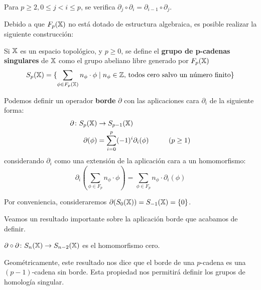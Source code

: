 \begin{corollary}
  Para $p \geq 2, 0 \leq j < i \leq p$, se verifica $\partial_j \circ \partial_i = \partial_{i-1} \circ \partial_j$.
\end{corollary}

Debido a que $F_{p}({\mathbb X})$ no está dotado de estructura algebraica, es posible realizar la siguiente construcción:

\begin{definition}
  Si ${\mathbb X}$ es un espacio topológico, y $p \geq 0$, se define el \textbf{grupo de p-cadenas singulares} de ${\mathbb X}$
  como el grupo abeliano libre generado por $F_{p}({\mathbb X})$
  \[ S_p({\mathbb X}) = \{\sum_{\phi \in F_{p}({\mathbb X})} n_\phi \cdot \phi  \mid n_\phi \in \mathbb{Z} \text{, todos cero salvo un número finito} \}\]

  Podemos definir un operador \textbf{borde} $\partial$ con las aplicaciones cara $\partial_i$ de la siguiente forma:
  \begin{align*}
    \partial \colon S_p({\mathbb X}) &\to S_{p-1}({\mathbb X})\\
    \partial(\phi) &= \sum_{i = 0}^p (-1)^i \partial_i(\phi)  \hspace{1cm} (p \geq 1)
  \end{align*}
  considerando $\partial_i$ como una extensión de la aplicación cara a un homomorfismo:
  \[\partial_i(\sum_{\phi \in F_p} n_\phi \cdot \phi) = \sum_{\phi \in F_p} n_\phi \cdot \partial_i(\phi) \]
\end{definition}

Por conveniencia, consideraremos $\partial(S_0({\mathbb X})) = S_{-1}({\mathbb X}) = \{0\}$.


Veamos un resultado importante sobre la aplicación borde que acabamos de definir.

\begin{proposition}
  $\partial \circ \partial \colon S_{n}({\mathbb X}) \to S_{n-2}({\mathbb X})$ es el homomorfismo cero.
\end{proposition}

Geométricamente, este resultado nos dice que el borde de una $p$-cadena es una $(p-1)$-cadena sin
borde. Esta propiedad nos permitirá definir los grupos de homología singular.

